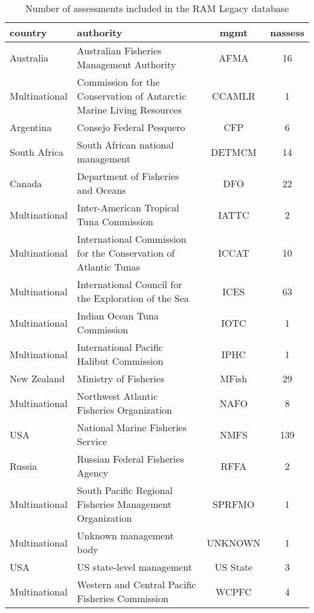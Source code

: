 \begin{table}[ht]
\begin{center}
\caption{Number of assessments included in the RAM Legacy database}
\label{tab:mgmt}
\begin{tabular}{p{3cm}p{5cm}cc}
  \hline
country & authority & mgmt & nassess \\ 
  \hline
Australia & Australian Fisheries Management Authority & AFMA &  16 \\ 
  Multinational & Commission for the Conservation of Antarctic Marine Living Resources & CCAMLR &   1 \\ 
  Argentina & Consejo Federal Pesquero & CFP &   6 \\ 
  South Africa & South African national management & DETMCM &  14 \\ 
  Canada & Department of Fisheries and Oceans & DFO &  22 \\ 
  Multinational & Inter-American Tropical Tuna Commission & IATTC &   2 \\ 
  Multinational & International Commission for the Conservation of Atlantic Tunas & ICCAT &  10 \\ 
  Multinational & International Council for the Exploration of the Sea & ICES &  63 \\ 
  Multinational & Indian Ocean Tuna Commission & IOTC &   1 \\ 
  Multinational & International Pacific Halibut Commission & IPHC &   1 \\ 
  New Zealand & Ministry of Fisheries & MFish &  29 \\ 
  Multinational & Northwest Atlantic Fisheries Organization & NAFO &   8 \\ 
  USA & National Marine Fisheries Service & NMFS & 139 \\ 
  Russia & Russian Federal Fisheries Agency & RFFA &   2 \\ 
  Multinational & South Pacific Regional Fisheries Management Organization & SPRFMO &   1 \\ 
  Multinational & Unknown management body & UNKNOWN &   1 \\ 
  USA & US state-level management & US State &   3 \\ 
  Multinational & Western and Central Pacific Fisheries Commission & WCPFC &   4 \\ 
   \hline
\end{tabular}
\end{center}
\end{table}
